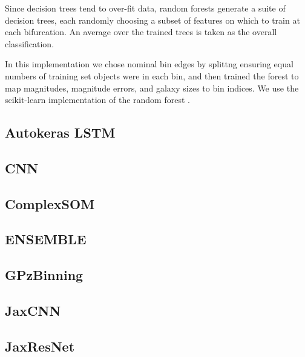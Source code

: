 \documentclass[twocolumn,twocolappendix]{aastex63}
\begin{document}
Since decision trees tend to over-fit data, random forests generate a suite of decision
trees, each randomly choosing a subset of features on which to train at each bifurcation.
An average over the trained trees is taken as the overall classification.

In this implementation we chose nominal bin edges by splittng ensuring equal numbers of training set 
objects were in each bin, and then trained the forest to map magnitudes, magnitude errors, and
galaxy sizes to bin indices.  We use the {\sc scikit-learn} implementation of the random forest
\citep{scikit-learn}.



\subsection{ {\sc Autokeras LSTM} }


\subsection{ {\sc CNN} }


\subsection{ {\sc ComplexSOM} }


\subsection{ {\sc ENSEMBLE} }


\subsection{ {\sc GPzBinning} }


\subsection{ {\sc JaxCNN} }


\subsection{ {\sc JaxResNet} }
\end{document}
